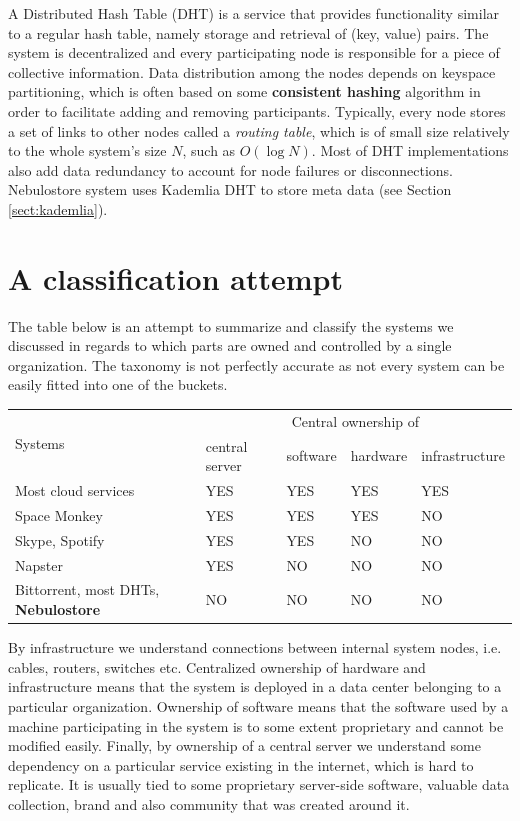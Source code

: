 \documentclass{pracamgren}
\newcounter{collective_ctr} \numberwithin{collective_ctr}{chapter}
\begin{document}
A Distributed Hash Table (DHT) is a service that provides functionality similar to a regular hash table, namely storage and retrieval of (key, value) pairs. The system is decentralized and every participating node is responsible for a piece of collective information. Data distribution among the nodes depends on keyspace partitioning, which is often based on some {\bf consistent hashing} algorithm in order to facilitate adding and removing participants. Typically, every node stores a set of links to other nodes called a {\it routing table}, which is of small size relatively to the whole system's size $N$, such as $O(\log N)$. Most of DHT implementations also add data redundancy to account for node failures or disconnections. Nebulostore system uses Kademlia \cite{kademlia} DHT to store meta data (see Section \ref{sect:kademlia}).\\

\section{A classification attempt}

The table below is an attempt to summarize and classify the systems we discussed in regards to which parts are owned and controlled by a single organization. The taxonomy is not perfectly accurate as not every system can be easily fitted into one of the buckets.

\begin{center}
    \begin{tabular}{ | l | l | l | l | l |}
    \hline
    \multirow{2}{*}{Systems} & \multicolumn{4}{|c|}{Central ownership of} \\
    \cline{2-5}
     & central server & software & hardware & infrastructure \\
    \hline
    Most cloud services & YES & YES & YES & YES \\
    \hline
    Space Monkey & YES & YES & YES & NO \\
    \hline
    Skype, Spotify & YES & YES & NO & NO\\
    \hline
    Napster & YES & NO & NO & NO\\
    \hline
    Bittorrent, most DHTs, {\bf Nebulostore} & NO & NO & NO & NO \\
    \hline
    \end{tabular}
\end{center}

By infrastructure we understand connections between internal system nodes, i.e. cables, routers, switches etc.
Centralized ownership of hardware and infrastructure means that the system is deployed in a data center belonging to a particular organization. Ownership of software means that the software used by a machine participating in the system is to some extent proprietary and cannot be modified easily. Finally, by ownership of a central server we understand some dependency on a particular service existing in the internet, which is hard to replicate. It is usually tied to some proprietary server-side software, valuable data collection, brand and also community that was created around it.\\
\end{document}
